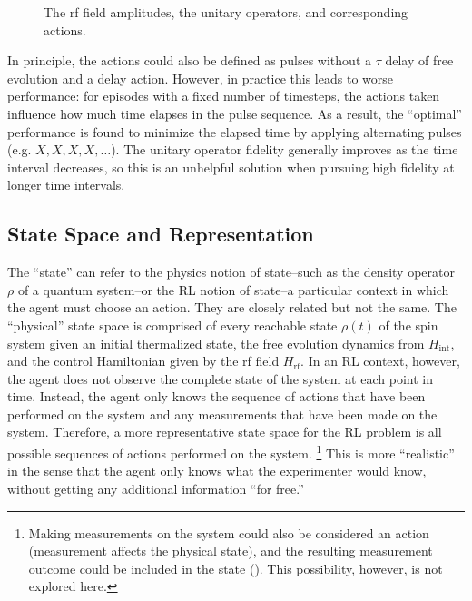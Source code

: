 \begin{figure}[H]
    \centering
    
    \caption{The rf field amplitudes, the unitary operators, and corresponding actions.}
    \label{fig:actions}
\end{figure}

In principle, the actions could also be defined as pulses without a $\tau$ delay of free evolution and a delay action. However, in practice this leads to worse performance: for episodes with a fixed number of timesteps, the actions taken influence how much time elapses in the pulse sequence. As a result, the ``optimal'' performance is found to minimize the elapsed time by applying alternating pulses (e.g. $X, \overline{X}, X, \overline{X}, \dots$).
The unitary operator fidelity generally improves as the time interval decreases, so this is an unhelpful solution when pursuing high fidelity at longer time intervals.

\subsection{State Space and Representation}

The ``state'' can refer to the physics notion of state--such as the density operator $\rho$ of a quantum system--or the RL notion of state--a particular context in which the agent must choose an action. They are closely related but not the same.
The ``physical'' state space is comprised of every reachable state $\rho(t)$ of the spin system given an initial thermalized state, the free evolution dynamics from $H_{\text{int}}$, and the control Hamiltonian given by the rf field $H_{\text{rf}}$.
In an RL context, however, the agent does not observe the complete state of the system at each point in time. Instead, the agent only knows the sequence of actions that have been performed on the system and any measurements that have been made on the system.
Therefore, a more representative state space for the RL problem is all possible sequences of actions performed on the system.%
\footnote{
Making measurements on the system could also be considered an action (measurement affects the physical state), and the resulting measurement outcome could be included in the state (\cite{porotti2019coherent}). This possibility, however, is not explored here.
}
This is more ``realistic'' in the sense that the agent only knows what the experimenter would know, without getting any additional information ``for free.''


